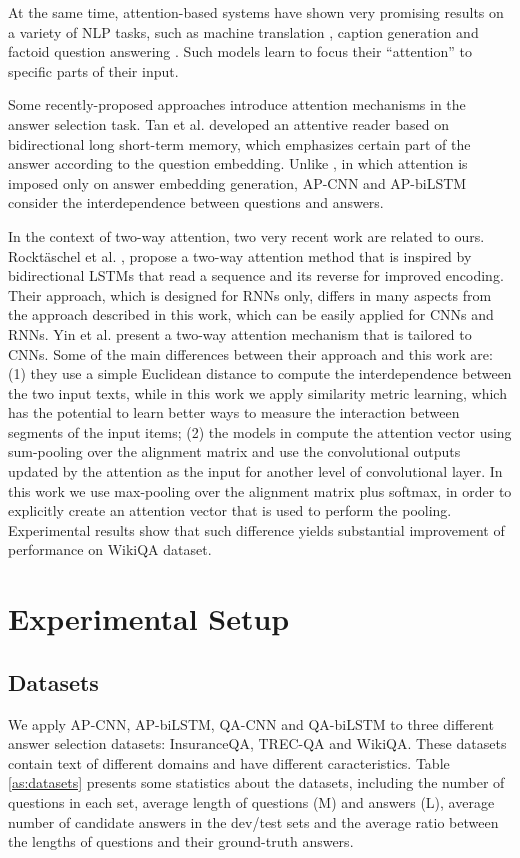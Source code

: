 \documentclass{article}
\begin{document}
At the same time, attention-based systems have shown very promising results on a variety of NLP tasks, such as machine translation \cite{bahdanau2015:ICLR,sutskever2014}, caption generation \cite{xu:icml2015} and factoid question answering \cite{moritz:NIPS2015}. 
Such models learn to focus their “attention” to specific parts of their input. 

Some recently-proposed approaches introduce  attention mechanisms in the answer selection task. Tan et al.  developed an attentive reader based on bidirectional long short-term memory, which emphasizes certain part of the answer according to the question embedding. Unlike \cite{tan:Arxiv15}, in which attention is imposed only on answer embedding generation, AP-CNN and AP-biLSTM consider the interdependence between questions and answers.

In the context of two-way attention,
two very recent work are related to ours.
Rockt{\"{a}}schel et al. ,
propose a two-way attention method that is inspired by bidirectional LSTMs that read a sequence and its reverse for improved encoding.
Their approach,
which is designed for RNNs only,
differs in many aspects from the approach described in this work,
which can be easily applied for CNNs and RNNs.
Yin et al.  present a two-way attention mechanism that is tailored to CNNs.
Some of the main differences between their approach and this work are: (1) they use a simple Euclidean distance to compute the interdependence between the two input texts, while in this work we apply similarity metric learning, which has the potential to learn better ways to measure the interaction between segments of the input items; (2) the models in \cite{yin2015} compute the attention vector using sum-pooling over the alignment matrix and use the convolutional outputs updated by the attention as the input for another level of convolutional layer. In this work we use max-pooling over the alignment matrix plus softmax, in order to explicitly create an attention vector that is used to perform the pooling. Experimental results show that such difference yields substantial improvement of performance on WikiQA dataset.  \section{Experimental Setup}
\label{experimental_setup}


\subsection{Datasets}
We apply AP-CNN, 
AP-biLSTM,
QA-CNN and
QA-biLSTM to three different answer selection datasets:
InsuranceQA,
TREC-QA
and WikiQA.
These datasets contain text of different domains and have different caracteristics.
Table \ref{as:datasets} presents some statistics about the datasets, including the number of questions in each set, average length of questions (M) and answers (L), average number of candidate answers in the dev/test sets and the average ratio between the lengths of questions and their ground-truth answers. 
\end{document}
